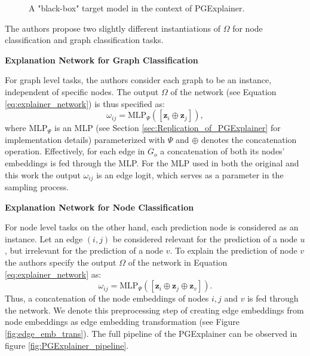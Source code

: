 \begin{figure}
\begin{tikzpicture}
    \end{tikzpicture}
    \caption["Black-box" target model in PGExplainer context.]{A "black-box" target model in the context of PGExplainer.}
    \label{fig:blackbox_downstream_model}
\end{figure}

The authors propose two slightly different instantiations of $\Omega$ for node classification and graph classification tasks. \bigskip

\textbf{Explanation Network for Graph Classification}\par
For graph level tasks, the authors consider each graph to be an instance, independent  of specific nodes. The output $\Omega$ of the network (see Equation \ref{eq:explainer_network}) is thus specified as:
\begin{equation}
    \label{eq:mlp_graph_input}
    \omega_{ij} = \text{MLP}_\Psi ([\mathbf{z}_i\oplus\mathbf{z}_j]),
\end{equation}
where $\text{MLP}_\Psi$ is an MLP (see Section \ref{sec:Replication_of_PGExplainer} for implementation details) parameterized with $\Psi$ and $\oplus$ denotes the concatenation operation. Effectively, for each edge in $G_o$ a concatenation of both its nodes' embeddings is fed through the MLP. For the MLP used in both the original and this work the output $\omega_{ij}$ is an edge logit, which serves as a parameter in the sampling process. \bigskip

\textbf{Explanation Network for Node Classification}\par
For node level tasks on the other hand, each prediction node is considered as an instance. Let an edge $(i,j)$ be considered relevant for the prediction of a node $u$, but irrelevant for the prediction of a node $v$. To explain the prediction of node $v$ the authors specify the output $\Omega$ of the network in Equation \ref{eq:explainer_network} as:
\begin{equation}
    \omega_{ij} = \text{MLP}_\Psi ([\mathbf{z}_i\oplus\mathbf{z}_j\oplus\mathbf{z}_v]).
\end{equation}
Thus, a concatenation of the node embeddings of nodes $i, j$ and $v$ is fed through the network. We denote this preprocessing step of creating edge embeddings from node embeddings as edge embedding transformation (see Figure \ref{fig:edge_emb_trans}). The full pipeline of the PGExplainer can be observed in figure \ref{fig:PGExplainer_pipeline}. \bigskip

